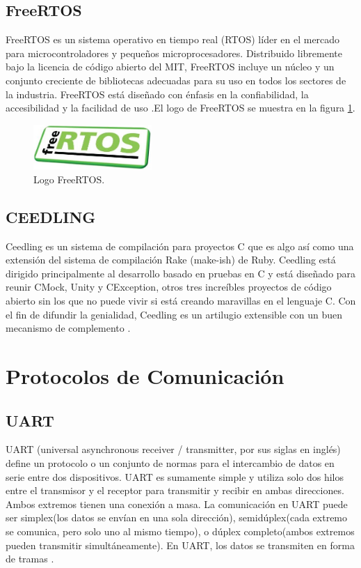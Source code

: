 \subsection{FreeRTOS}
\label{subsec:FreeRTOS}
FreeRTOS es un sistema operativo en tiempo real (RTOS) líder en el mercado para microcontroladores y pequeños microprocesadores. Distribuido libremente bajo la licencia de código abierto del MIT, FreeRTOS incluye un núcleo y un conjunto creciente de bibliotecas adecuadas para su uso en todos los sectores de la industria.
FreeRTOS está diseñado con énfasis en la confiabilidad, la accesibilidad y la facilidad de uso \citep{FreeRTOS}.El logo de FreeRTOS se muestra en la figura \ref{fig:FreeRTOS}.
\begin{figure}[htbp]
	\centering
	\includegraphics[width=0.4\textwidth]{./Figures/logo_FreeRTOS.jpg}
	\caption{Logo FreeRTOS.}
	\label{fig:FreeRTOS}
\end{figure}
\subsection{CEEDLING}
Ceedling es un sistema de compilación para proyectos C que es algo así como una extensión del sistema de compilación Rake (make-ish) de Ruby. Ceedling está dirigido principalmente al desarrollo basado en pruebas en C y está diseñado para reunir CMock, Unity y CException, otros tres increíbles proyectos de código abierto sin los que no puede vivir si está creando maravillas en el lenguaje C. Con el fin de difundir la genialidad, Ceedling es un artilugio extensible con un buen mecanismo de complemento \citep{CEEDLING}.

\section{Protocolos de Comunicación}
\subsection{UART}
UART (universal asynchronous receiver / transmitter, por sus siglas en inglés) define un protocolo o un conjunto de normas para el intercambio de datos en serie entre dos dispositivos. UART es sumamente simple y utiliza solo dos hilos entre el transmisor y el receptor para transmitir y recibir en ambas direcciones. Ambos extremos tienen una conexión a masa. La comunicación en UART puede ser simplex(los datos se envían en una sola dirección), semidúplex(cada extremo se comunica, pero solo uno al mismo tiempo), o dúplex completo(ambos extremos pueden transmitir simultáneamente). En UART, los datos se transmiten en forma de tramas \citep{UART}.
